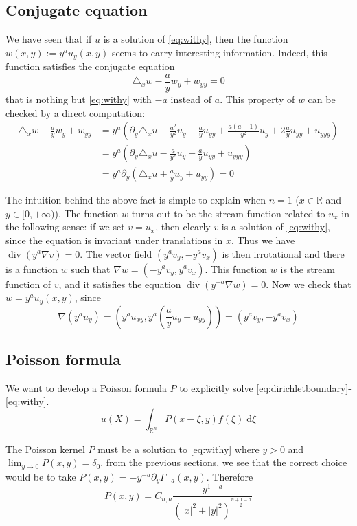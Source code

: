 \documentclass[letterpaper]{article}
\numberwithin{equation}{section}
\newcommand{\abs}[1]{\left\vert#1\right\vert}
\newcommand{\R}{\mathbb R}
\newcommand{\grad} {\nabla}
\newcommand{\lap} {\triangle}
\newcommand{\dd} {\; \mathrm{d}}
\DeclareMathOperator{\dv}{div}
\newcommand{\party}[1] {#1_y}
\newcommand{\partyy}[1] {#1_{yy}}
\newcommand{\partx}[1] {#1_x}
\begin{document}
\subsection{Conjugate equation}
We have seen that if $u$ is a solution of \eqref{eq:withy}, then the function $w(x,y) := y^a u_y(x,y)$ seems to carry interesting information. Indeed, this function satisfies the conjugate equation
\[ \lap_x w - \frac{a}{y} w_y + w_{yy} = 0\]
that is nothing but \eqref{eq:withy} with $-a$ instead of $a$. This property of $w$ can be checked by a direct computation:
\begin{align*}
\lap_x w - \frac{a}{y} w_y + \partyy w &= y^a \left( \partial_y \lap_x u - \frac{a^2}{y^2} \party u -  \frac{a}{y}  \partyy u + \frac{a(a-1)}{y^2} \party u + 2 \frac{a}{y} \partyy u + u_{yyy} \right) \\
&= y^a \left( \partial_y \lap_x u - \frac{a}{y^2} \party u + \frac{a}{y} \partyy u + u_{yyy} \right) \\
&= y^a \partial_y \left( \lap_x u + \frac{a}{y} \party u + \partyy u \right) = 0
\end{align*}

The intuition behind the above fact is simple to explain when $n=1$ ($x\in \R$ and $y \in  [0,+\infty)$). The function $w$ turns out to be the stream function related to $u_x$ in the following sense: if we set $v = \partx u$, then clearly $v$ is a solution of \eqref{eq:withy}, since the equation is invariant under translations in $x$. Thus we have $\dv (y^a \grad v) = 0$. The vector field $(y^a \party v, -y^a \partx v)$ is then irrotational and there is a function $w$ such that $\grad w = (-y^a \party v, y^a \partx v)$. This function $w$ is the stream function of $v$, and it satisfies the equation $\dv (y^{-a} \grad w) = 0$. Now we check that $w = y^a \party u(x,y)$, since \[\grad (y^a \party u) = \left( y^a u_{xy} , y^a \left( \frac{a}{y} \party u + \partyy u \right) \right) = (y^a \party v, -y^a \partx v) \]


\subsection{Poisson formula}
We want to develop a Poisson formula $P$ to explicitly solve \eqref{eq:dirichletboundary}-\eqref{eq:withy}.
\[ u(X) = \int_{\R^n} P(x-\xi,y) f(\xi) \dd \xi \]

The Poisson kernel $P$ must be a solution to \eqref{eq:withy} where $y>0$ and $\lim_{y \to 0} P(x,y) = \delta_0$. from the previous sections, we see that the correct choice would be to take $P(x,y) = -y^{-a} \partial_y \Gamma_{-a}(x,y)$. Therefore
\begin{equation} \label{eq:poisson}
P(x,y) = %
C_{n,a} \frac{y^{1-a}}{\left( \abs{x}^2 + \abs{y}^2 \right)^{\frac{n+1-a}{2}}}
\end{equation}
\end{document}
